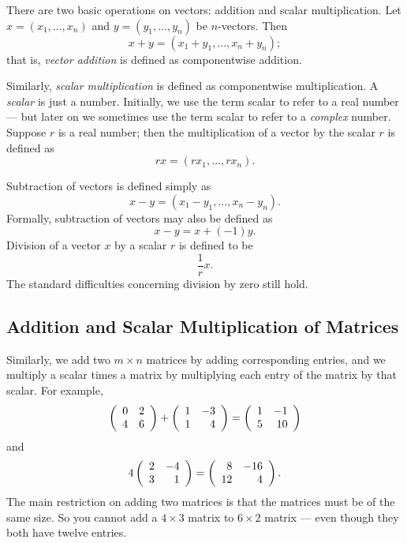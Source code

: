 \documentclass{ximera}
\begin{document}
There are two basic operations on vectors: addition and scalar
multiplication.  Let $x=(x_1,\ldots,x_n)$ and
$y=(y_1,\ldots,y_n)$ be $n$-vectors.  Then
\[
x+y=(x_1+y_1,\ldots,x_n+y_n);
\]
that is, {\em vector addition\/} is
defined as componentwise addition.

Similarly, {\em scalar multiplication\/}
is defined as
componentwise multiplication.  A {\em scalar\/} is just a
number. Initially, we use the term scalar to refer to a real
number --- but later on we sometimes use the term scalar
to refer to a {\em complex\/} number.  Suppose $r$ is a real
number; then the multiplication of a vector by the scalar $r$
is defined as
\[
rx = (rx_1,\ldots,rx_n).
\]

Subtraction of vectors is defined simply as
\[
x-y = (x_1-y_1,\ldots,x_n-y_n).
\]
Formally, subtraction of vectors may also be defined as
\[
x-y = x+(-1)y.
\]
Division of a vector $x$ by a scalar $r$ is defined to be
\[
\frac{1}{r} x.
\]
The standard difficulties concerning division by zero still hold.

\subsection*{Addition and Scalar Multiplication of Matrices}

Similarly, we add two $m\times n$ matrices
by adding corresponding
entries, and we multiply a scalar times a matrix by multiplying each
entry of the matrix by that scalar.
For example,
\[
\left(\begin{array}{rr} 0 & 2\\ 4 &6\end{array}\right) + \left(\begin{array}{rr} 1 & -3\\ 1 &4\end{array}\right) = \left(\begin{array}{rr} 1 & -1\\ 5 &10\end{array}\right)
\]
and
\[
4\left(\begin{array}{rr} 2 & -4\\ 3 &1\end{array}\right) = \left(\begin{array}{rr} 8 & -16\\ 12 &4\end{array}\right).
\]
The main restriction on adding two matrices is that the matrices must
be of the same size.  So you cannot add a $4\times 3$ matrix to $6\times 2$
matrix --- even though they both have twelve entries.



\EXER

\TEXER
\end{document}
